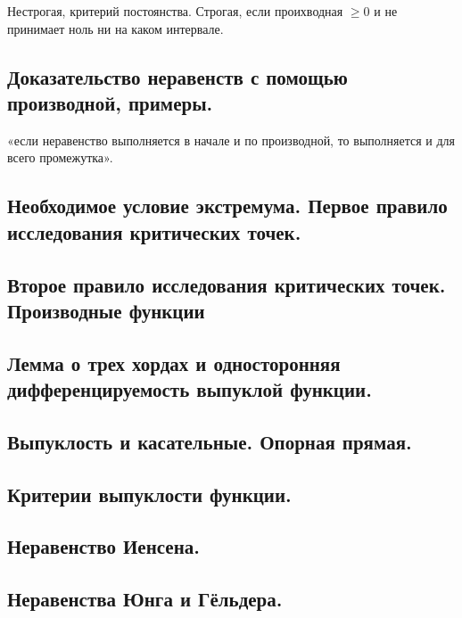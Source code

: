 \documentclass[12pt, a4paper]{article}
\begin{document}
Нестрогая, критерий постоянства.
Строгая, если проихводная $\geqslant 0$ и не принимает ноль ни на каком интервале.

\subsection{Доказательство неравенств с помощью производной, примеры.}

«если неравенство выполняется в начале и по производной, то выполняется и для всего промежутка».


\subsection{Необходимое условие экстремума. Первое правило исследования критических точек.}



\subsection{Второе правило исследования критических точек. Производные функции}



\subsection{Лемма о трех хордах и односторонняя дифференцируемость выпуклой функции.}



\subsection{Выпуклость и касательные. Опорная прямая.}



\subsection{Критерии выпуклости функции.}



\subsection{Неравенство Иенсена.}



\subsection{Неравенства Юнга и Гёльдера.}
\end{document}
